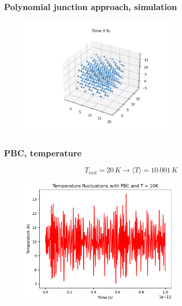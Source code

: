 \documentclass{beamer}
\begin{document}
\begin{frame}
    \frametitle{Polynomial junction approach, simulation}

    \begin{figure}
        \includegraphics[width=0.7\textwidth]{images/thumbnail.png}
    \end{figure}

\end{frame}

\begin{frame}
    \frametitle{PBC, temperature}

    $$T_{init}=20\,K \rightarrow \langle T \rangle =10.001    \,K $$

    \begin{figure}
        \includegraphics[width=0.7\textwidth]{images/temp5.png}
    \end{figure}

\end{frame}
\end{document}
